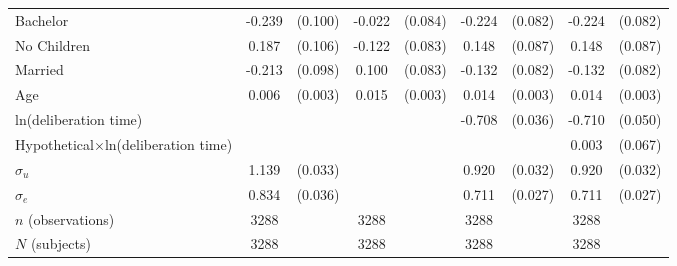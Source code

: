 \documentclass[12pt]{article}
\newcommand{\sym}[1]{\rlap{$^{#1}$}}
\begin{document}
\begin{table}[H]
{\begin{tabular}{l*{4}{cc}}
Bachelor    &      -0.239\sym{**} &     (0.100)&      -0.022         &     (0.084)&      -0.224\sym{***}&     (0.082)&      -0.224\sym{***}&     (0.082)\\
No Children &       0.187\sym{*}  &     (0.106)&      -0.122         &     (0.083)&       0.148\sym{*}  &     (0.087)&       0.148\sym{*}  &     (0.087)\\
Married     &      -0.213\sym{**} &     (0.098)&       0.100         &     (0.083)&      -0.132         &     (0.082)&      -0.132         &     (0.082)\\
Age         &       0.006\sym{**} &     (0.003)&       0.015\sym{***}&     (0.003)&       0.014\sym{***}&     (0.003)&       0.014\sym{***}&     (0.003)\\
ln(deliberation time)      &                     &            &                     &            &      -0.708\sym{***}&     (0.036)&      -0.710\sym{***}&     (0.050)\\
Hypothetical$\times$ln(deliberation time)&                     &            &                     &            &                     &            &       0.003         &     (0.067)\\
$\sigma_u$     &       1.139\sym{***}&     (0.033)&                     &            &       0.920\sym{***}&     (0.032)&       0.920\sym{***}&     (0.032)\\
$\sigma_e$     &       0.834\sym{***}&     (0.036)&                     &            &       0.711\sym{***}&     (0.027)&       0.711\sym{***}&     (0.027)\\
\hline
\(n\) (observations)       &        3288         &            &        3288         &            &        3288         &            &        3288         &            \\
\(N\) (subjects)       &        3288         &            &        3288         &            &        3288         &            &        3288         &            \\
\hline\hline
\end{tabular}
}







\end{table}
\end{document}
